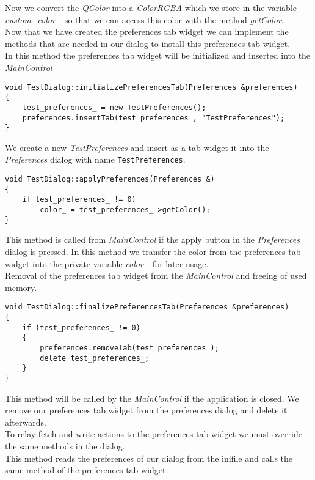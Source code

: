 Now we convert the {\em QColor} into a {\em ColorRGBA} which we store in the
variable {\em custom\_color\_} so that we can access this color with the method
{\em getColor}.\\

Now that we have created the preferences tab widget we can implement the methods that 
are needed in our dialog to install this preferences tab widget.\\ 

In this method the preferences tab widget will be initialized and inserted into the
{\em MainControl}

\begin{verbatim}
void TestDialog::initializePreferencesTab(Preferences &preferences)
{
	test_preferences_ = new TestPreferences();
	preferences.insertTab(test_preferences_, "TestPreferences");
}
\end{verbatim}

We create a new {\em TestPreferences} and insert as a tab widget it into the 
{\em Preferences} dialog with name {\tt TestPreferences}.

\begin{verbatim}
void TestDialog::applyPreferences(Preferences &)
{
	if test_preferences_ != 0)
		color_ = test_preferences_->getColor();
}
\end{verbatim}

This method is called from {\em MainControl} if the apply button in the {\em Preferences} dialog
is pressed.
In this method we transfer the color from the preferences tab widget into the private
variable {\em color\_} for later usage.\\

Removal of the preferences tab widget from the {\em MainControl} and freeing of used
memory.

\begin{verbatim}
void TestDialog::finalizePreferencesTab(Preferences &preferences)
{
	if (test_preferences_ != 0)
	{
		preferences.removeTab(test_preferences_);
		delete test_preferences_;
	}
}
\end{verbatim}

This method will be called by the {\em MainControl} if the application is closed. We
remove our preferences tab widget from the preferences dialog and delete it afterwards.\\

To relay fetch and write actions to the preferences tab widget we must override
the same methods in the dialog.\\
This method reads the preferences of our dialog from the inifile and calls
the same method of the preferences tab widget.

